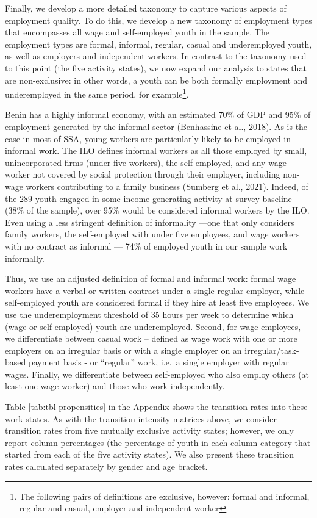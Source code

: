 \documentclass[
  11pt,
a4paper
]{article}
\begin{document}
Finally, we develop a more detailed taxonomy to capture various aspects of employment quality. To do this, we develop a new taxonomy of employment types that encompasses all wage and self-employed youth in the sample. The employment types are formal, informal, regular, casual and underemployed youth, as well as employers and independent workers. In contrast to the taxonomy used to this point (the five activity states), we now expand our analysis to states that are non-exclusive: in other words, a youth can be both formally employment and underemployed in the same period, for example\footnote{The following pairs of definitions are exclusive, however: formal and informal, regular and casual, employer and independent worker}.

Benin has a highly informal economy, with an estimated 70\% of GDP and 95\% of employment generated by the informal sector (Benhassine et al., 2018). As is the case in most of SSA, young workers are particularly likely to be employed in informal work. The ILO defines informal workers as all those employed by small, unincorporated firms (under five workers), the self-employed, and any wage worker not covered by social protection through their employer, including non-wage workers contributing to a family business (Sumberg et al., 2021). Indeed, of the 289 youth engaged in some income-generating activity at survey baseline (38\% of the sample), over 95\% would be considered informal workers by the ILO. Even using a less stringent definition of informality ---one that only considers family workers, the self-employed with under five employees, and wage workers with no contract as informal --- 74\% of employed youth in our sample work informally.

Thus, we use an adjusted definition of formal and informal work: formal wage workers have a verbal or written contract under a single regular employer, while self-employed youth are considered formal if they hire at least five employees. We use the underemployment threshold of 35 hours per week to determine which (wage or self-employed) youth are underemployed. Second, for wage employees, we differentiate between casual work -- defined as wage work with one or more employers on an irregular basis or with a single employer on an irregular/task-based payment basis - or ``regular'' work, i.e.~a single employer with regular wages. Finally, we differentiate between self-employed who also employ others (at least one wage worker) and those who work independently.

Table \ref{tab:tbl-propensities} in the Appendix shows the transition rates into these work states. As with the transition intensity matrices above, we consider transition rates from five mutually exclusive activity states; however, we only report column percentages (the percentage of youth in each column category that started from each of the five activity states). We also present these transition rates calculated separately by gender and age bracket.
\end{document}
